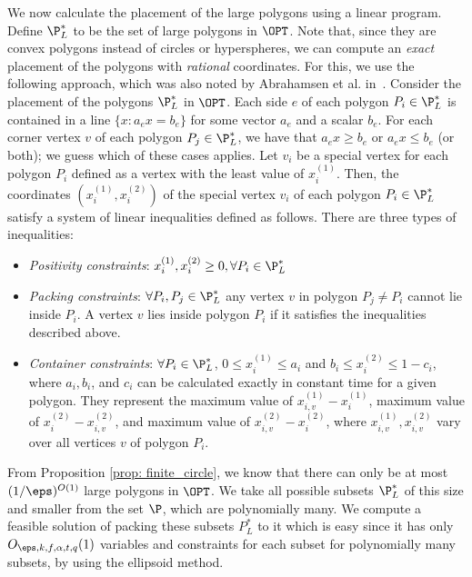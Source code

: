 We now calculate the placement of the large polygons using a linear program. Define $\P_{L}^*$ to be the set of large polygons in $\OPT$.
Note that, since they are convex polygons instead of circles or hyperspheres, we can compute an \emph{exact }placement of the polygons with \emph{rational }coordinates.
For this, we use the following approach, which was also noted by Abrahamsen et al. in~\cite{abrahamsen2020framework}. Consider
the placement of the polygons $\P_{L}^{*}$ in $\OPT$. Each
side $e$ of each polygon $P_{i}\in\P_{L}^{*}$ is contained in a
line $\{x :a_{e}x=b_{e}\}$ for some vector $a_{e}$
and a scalar $b_{e}$. For each corner vertex $v$ of each polygon $P_{j}\in\P_{L}^{*}$,
we have that $a_{e}x\ge b_{e}$ or $a_{e}x\le b_{e}$ (or both); we
guess which of these cases applies. Let $v_{i}$ be a special vertex for each polygon $P_i$ defined as a vertex with the least value of $x_{i}^{(1)}$. Then, the coordinates
$({x}_{i}^{(1)},{x}_{i}^{(2)})$ of the special vertex $v_{i}$
of each polygon $P_{i}\in\P_{L}^{*}$ satisfy a system
of linear inequalities defined as follows.
There are three types of inequalities:
\begin{itemize}
	\item \emph{Positivity constraints}: $x_{i}^{(1)},x_{i}^{(2)} \ge0, \forall P_{i}\in\P_{L}^{*}\nonumber$
	
	\item \emph{Packing constraints}: $\forall P_{i},P_{j} \in \P_{L}^{*}$ any vertex $v$ in polygon $P_{j} \neq P_{i}$ cannot lie inside $P_{i}$. A vertex $v$ lies inside polygon $P_{i}$ if it satisfies the inequalities described above.
	
	\item \emph{Container constraints}:  $\forall P_{i}\in\P_{L}^{*}\nonumber$, $0 \leq x_{i}^{(1)} \leq a_i$ and $b_i \leq x_{i}^{(2)} \leq 1-c_i$, where $a_i, b_i$, and $c_i$ can be calculated exactly in constant time for a given polygon. They represent the maximum value of $x_{i,v}^{(1)}-x_{i}^{(1)}$, maximum value of $x_{i}^{(2)}-x_{i,v}^{(2)}$, and maximum value of $x_{i,v}^{(2)}-x_{i}^{(2)}$, where $x_{i,v}^{(1)},x_{i,v}^{(2)}$ vary over all vertices $v$ of polygon $P_{i}$.
	
\end{itemize}

From Proposition \ref{prop: finite_circle}, we know that there can only be at most $(1/\eps)^{O(1)}$
large polygons in $\OPT$. We take all possible subsets $\P_L ^*$ of this size and smaller from the set $\P$, which are polynomially many.
We compute a feasible solution of packing these subsets $P_L ^*$ to it which is easy since it has only
$O_{\eps, k, f, \alpha, t, q}(1)$ variables and constraints for each subset for polynomially many subsets, by using the ellipsoid method.

